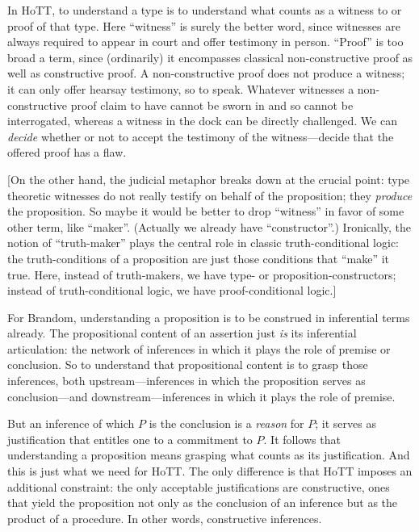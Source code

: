 In HoTT, to understand a type is to understand what counts as a
witness to or proof of that type.  Here ``witness'' is surely the
better word, since witnesses are always required to appear in court
and offer testimony in person.  ``Proof'' is too broad a term, since
(ordinarily) it encompasses classical non-constructive proof as well
as constructive proof.  A non-constructive proof does not produce a
witness; it can only offer hearsay testimony, so to speak.  Whatever
witnesses a non-constructive proof claim to have cannot be sworn in
and so cannot be interrogated, whereas a witness in the dock can be
directly challenged.  We can \textit{decide} whether or not to accept
the testimony of the witness---decide that the offered proof has a
flaw.

[On the other hand, the judicial metaphor breaks down at the crucial
  point: type theoretic witnesses do not really testify on behalf of
  the proposition; they \textit{produce} the proposition.  So maybe it
  would be better to drop ``witness'' in favor of some other term,
  like ``maker''.  (Actually we already have ``constructor''.)
  Ironically, the notion of ``truth-maker'' plays the central role in
  classic truth-conditional logic: the truth-conditions of a
  proposition are just those conditions that ``make'' it true.  Here,
  instead of truth-makers, we have type- or proposition-constructors;
  instead of truth-conditional logic, we have proof-conditional
  logic.]


For Brandom, understanding a proposition is to be construed in
inferential terms already.  The propositional content of an assertion
just \textit{is} its inferential articulation: the network of
inferences in which it plays the role of premise or conclusion.  So to
understand that propositional content is to grasp those inferences,
both upstream---inferences in which the proposition serves as
conclusion---and downstream---inferences in which it plays the role of
premise.


But an inference of which \(P\) is the conclusion is a \textit{reason}
for \(P\); it serves as justification that entitles one to a
commitment to \(P\).  It follows that understanding a proposition
means grasping what counts as its justification.  And this is just
what we need for HoTT.  The only difference is that HoTT imposes an
additional constraint: the only acceptable justifications are
constructive, ones that yield the proposition not only as the
conclusion of an inference but as the product of a procedure.  In
other words, constructive inferences.

